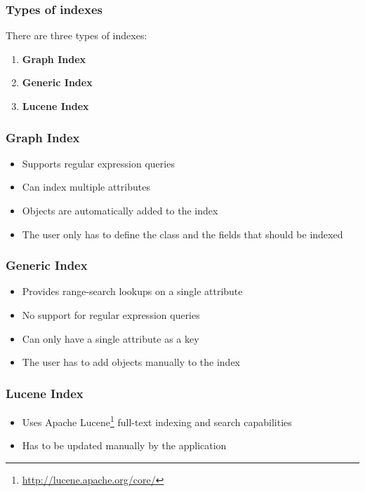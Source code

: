 
\begin{frame}
\frametitle{Types of indexes}
There are three types of indexes:

\begin{enumerate}
	\item \textbf{Graph Index}
	\item \textbf{Generic Index}
	\item \textbf{Lucene Index}
\end{enumerate}
\end{frame} 

\begin{frame}
\frametitle{Graph Index}
\begin{itemize}
	\pause
	\item Supports regular expression queries \pause
	\item Can index multiple attributes \pause
	\item Objects are automatically added to the index \pause
	\item The user only has to define the class and the fields that should be indexed 
\end{itemize}
\end{frame} 

\begin{frame}
\frametitle{Generic Index}
\begin{itemize}
	\pause
	\item Provides range-search lookups on a single attribute \pause
	\item No support for regular expression queries \pause
	\item Can only have a single attribute as a key \pause
	\item The user has to add objects manually to the index 
\end{itemize}
\end{frame} 

\begin{frame}
\frametitle{Lucene Index}
\begin{itemize}
	\item Uses Apache Lucene\footnote{\url{http://lucene.apache.org/core/}} full-text indexing and search capabilities
	\item Has to be updated manually by the application
\end{itemize}
\end{frame}